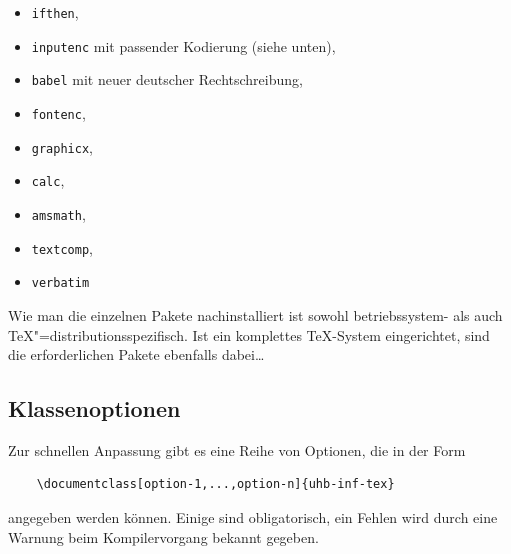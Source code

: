 \documentclass[nicefonts,nogruppe,nosemester,noveranstaltung,notutor,noabgabe,utf]{uhb-inf-tex}
\begin{document}
\begin{itemize}
	\item \texttt{ifthen},
	\item \texttt{inputenc} mit passender Kodierung (siehe unten),
	\item \texttt{babel} mit neuer deutscher Rechtschreibung,
	\item \texttt{fontenc},
	\item \texttt{graphicx},
	\item \texttt{calc},
	\item \texttt{amsmath},
	\item \texttt{textcomp},
	\item \texttt{verbatim}
\end{itemize}

Wie man die einzelnen Pakete nachinstalliert ist sowohl betriebssystem- als auch \TeX"=distributionsspezifisch. Ist ein komplettes \TeX-System eingerichtet, sind die erforderlichen Pakete ebenfalls dabei\dots

\subsection{Klassenoptionen}

Zur schnellen Anpassung gibt es eine Reihe von Optionen, die in der Form

\begin{verbatim}
    \documentclass[option-1,...,option-n]{uhb-inf-tex}
\end{verbatim}

angegeben werden können. Einige sind obligatorisch, ein Fehlen wird durch eine Warnung beim Kompilervorgang bekannt gegeben.
\end{document}
